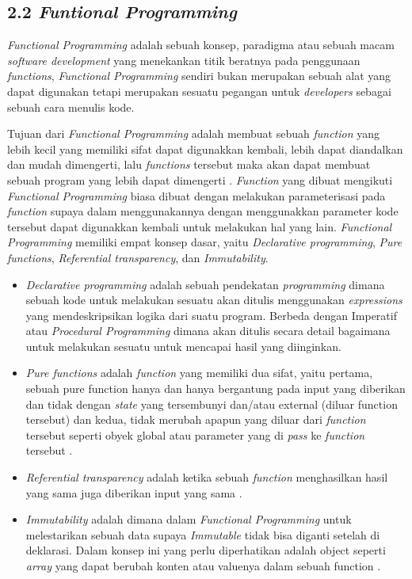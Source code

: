 \documentclass[a4paper]{article}
\begin{document}
\newpage
\subsection*{2.2 \textit{Funtional Programming}}
\textit{Functional Programming} adalah sebuah konsep, paradigma atau sebuah macam \textit{software development} yang menekankan titik beratnya pada penggunaan \textit{functions}, \textit{Functional Programming} sendiri bukan merupakan sebuah alat yang dapat digunakan tetapi merupakan sesuatu pegangan untuk \textit{developers} sebagai sebuah cara menulis kode\autocite{atencio2016functional}.


Tujuan dari \textit{Functional Programming} adalah membuat sebuah \textit{function} yang lebih kecil yang memiliki sifat dapat digunakkan kembali, lebih dapat diandalkan dan mudah dimengerti, lalu \textit{functions} tersebut maka akan dapat membuat sebuah program yang lebih dapat dimengerti \autocite{atencio2016functional}. \textit{Function} yang dibuat mengikuti \textit{Functional Programming} biasa dibuat dengan melakukan parameterisasi pada \textit{function} supaya dalam menggunakannya dengan menggunakkan parameter kode tersebut dapat digunakkan kembali untuk melakukan hal yang lain. \textit{Functional Programming} memiliki empat konsep dasar, yaitu \textit{Declarative programming}, \textit{Pure functions}, \textit{Referential transparency}, dan \textit{Immutability}\autocite{atencio2016functional}.


\begin{itemize}
    \item \textit{Declarative programming} adalah sebuah pendekatan \textit{programming} dimana sebuah kode untuk melakukan sesuatu akan ditulis menggunakan \textit{expressions} yang mendeskripsikan logika dari suatu program. Berbeda dengan Imperatif atau \textit{Procedural Programming} dimana akan ditulis secara detail bagaimana untuk melakukan sesuatu untuk mencapai hasil yang diinginkan\autocite{atencio2016functional}.
    \item \textit{Pure functions} adalah \textit{function} yang memiliki dua sifat, yaitu pertama, sebuah pure function hanya dan hanya bergantung pada input yang diberikan dan tidak dengan \textit{state} yang tersembunyi dan/atau external (diluar function tersebut) dan kedua, tidak merubah apapun yang diluar dari \textit{function} tersebut seperti obyek global atau parameter yang di \textit{pass} ke \textit{function} tersebut \autocite{atencio2016functional}.
    \item \textit{Referential transparency} adalah ketika sebuah \textit{function} menghasilkan hasil yang sama juga diberikan input yang sama \autocite{atencio2016functional}.
    \item \textit{Immutability} adalah dimana dalam \textit{Functional Programming} untuk melestarikan sebuah data supaya \textit{Immutable} tidak bisa diganti setelah di deklarasi. Dalam konsep ini yang perlu diperhatikan adalah object seperti \textit{array} yang dapat berubah konten atau valuenya dalam sebuah function \autocite{atencio2016functional}.
\end{itemize}
\end{document}
